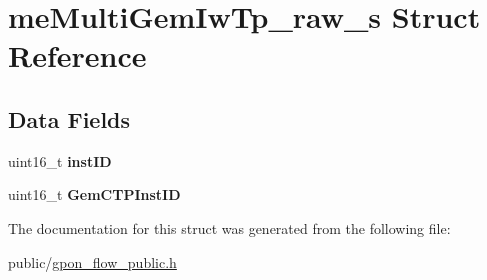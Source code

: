 \hypertarget{structmeMultiGemIwTp__raw__s}{}\section{me\+Multi\+Gem\+Iw\+Tp\+\_\+raw\+\_\+s Struct Reference}
\label{structmeMultiGemIwTp__raw__s}
\subsection*{Data Fields}
\begin{DoxyCompactItemize}
\item 
\mbox{\label{structmeMultiGemIwTp__raw__s_adb14db377169b5927d6b1aa1a112ab1d}} 
uint16\+\_\+t {\bfseries inst\+ID}
\item 
\mbox{\label{structmeMultiGemIwTp__raw__s_ae99b5defa15b70ee75ed581d52098f3b}} 
uint16\+\_\+t {\bfseries Gem\+C\+T\+P\+Inst\+ID}
\end{DoxyCompactItemize}


The documentation for this struct was generated from the following file\+:\begin{DoxyCompactItemize}
\item 
public/\hyperlink{gpon__flow__public_8h}{gpon\+\_\+flow\+\_\+public.\+h}\end{DoxyCompactItemize}
